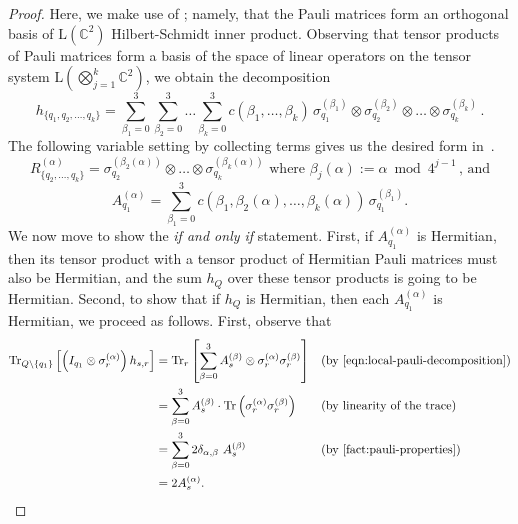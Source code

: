 \documentclass[11pt]{article}
\theoremstyle{plain}
\begin{document}
\begin{proof}
Here, we make use of ; namely, that the Pauli matrices form an orthogonal basis of $\mathrm{L}(\mathbb{C}^{2})$ Hilbert-Schmidt inner product. Observing that tensor products of Pauli matrices form a basis of the space of linear operators on the tensor system $\mathrm{L}\left(\bigotimes\limits_{j = 1}^k \mathbb{C}^2\right)$, we obtain the decomposition
    \[ h_{\{q_1, q_2, \dots, q_k\}} = \sum_{\beta_1=0}^{3} \sum_{\beta_2=0}^{3} \dots \sum_{\beta_k=0}^{3} c\left(\beta_1, \dots, \beta_k\right) \, \sigma_{q_1}^{(\beta_1)} \otimes \sigma_{q_2}^{(\beta_2)} \otimes \dots \otimes \sigma_{q_k}^{(\beta_k)} \, .\]
The following variable setting by collecting terms gives us the desired form in~.
\begin{equation}
    R_{\{q_2, \dots, q_k\}}^{(\alpha)} = \sigma_{q_2}^{(\beta_2(\alpha))} \otimes \dots \otimes \sigma_{q_k}^{(\beta_k(\alpha))} \text{ where } \beta_j(\alpha) := \alpha \bmod{4^{j - 1}}\, \text{, and}
\end{equation}
\begin{equation}
 A^{(\alpha)}_{q_1} = \sum_{\beta_1=0}^{3} c(\beta_1, \beta_2(\alpha), \dots, \beta_k(\alpha))   \, \sigma_{q_1}^{(\beta_1)}.
\end{equation}
We now move to show the \emph{if and only if} statement. First, if $A^{(\alpha)}_{q_1}$ is Hermitian, then its tensor product with a tensor product of Hermitian Pauli matrices must also be Hermitian, and the sum $h_{Q}$ over these tensor products is going to be Hermitian. Second, to show that if $h_{Q}$ is Hermitian, then each $A^{(\alpha)}_{q_1}$ is Hermitian, we proceed as follows. First, observe that
\begin{align}
\mathrm{Tr}_{Q\setminus\{q_1\}}\left[\left(I_{q_1} \otimes \sigma_r^{(\alpha)} \right) h_{s,r} \right] &= \mathrm{Tr}_{r} \left[\sum\limits_{\beta = 0}^{3} A_s^{(\beta)} \otimes \sigma_r^{(\alpha)} \sigma_r^{(\beta)}\right] && \text{(by \Cref{eqn:local-pauli-decomposition})}\\
    &= \sum\limits_{\beta = 0}^{3} A_s^{(\beta)} \cdot \mathrm{Tr}\left(\sigma_r^{(\alpha)} \sigma_r^{(\beta)}\right) && \text{(by linearity of the trace)}\\
    &= \sum\limits_{\beta = 0}^{3} 2\delta_{\alpha, \beta}\ A_s^{(\beta)}&& (\text{by \Cref{fact:pauli-properties}})\\
    &= 2 A_s^{(\alpha)}.
\end{align}


\end{proof}
\end{document}
